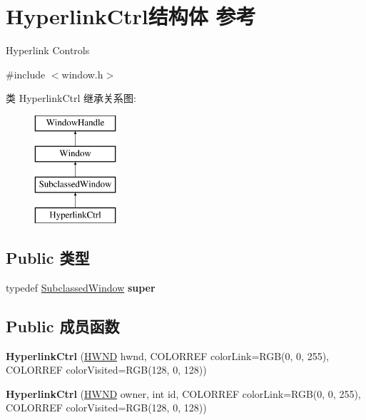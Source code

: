\hypertarget{struct_hyperlink_ctrl}{}\section{Hyperlink\+Ctrl结构体 参考}
\label{struct_hyperlink_ctrl}


Hyperlink Controls  




{\ttfamily \#include $<$window.\+h$>$}

类 Hyperlink\+Ctrl 继承关系图\+:\begin{figure}[H]
\begin{center}
\leavevmode
\includegraphics[height=4.000000cm]{struct_hyperlink_ctrl}
\end{center}
\end{figure}
\subsection*{Public 类型}
\begin{DoxyCompactItemize}
\item 
\mbox{\label{struct_hyperlink_ctrl_a27b878ea4a5f0d5a9a0640e5f0b4684e}} 
typedef \hyperlink{struct_subclassed_window}{Subclassed\+Window} {\bfseries super}
\end{DoxyCompactItemize}
\subsection*{Public 成员函数}
\begin{DoxyCompactItemize}
\item 
\mbox{\label{struct_hyperlink_ctrl_ab064cea5a345e47d3897eb2628a5e8b7}} 
{\bfseries Hyperlink\+Ctrl} (\hyperlink{interfacevoid}{H\+W\+ND} hwnd, C\+O\+L\+O\+R\+R\+EF color\+Link=R\+GB(0, 0, 255), C\+O\+L\+O\+R\+R\+EF color\+Visited=R\+GB(128, 0, 128))
\item 
\mbox{\label{struct_hyperlink_ctrl_ae30273e1c3b7946a4e2d243b0e6626ca}} 
{\bfseries Hyperlink\+Ctrl} (\hyperlink{interfacevoid}{H\+W\+ND} owner, int id, C\+O\+L\+O\+R\+R\+EF color\+Link=R\+GB(0, 0, 255), C\+O\+L\+O\+R\+R\+EF color\+Visited=R\+GB(128, 0, 128))
\end{DoxyCompactItemize}
